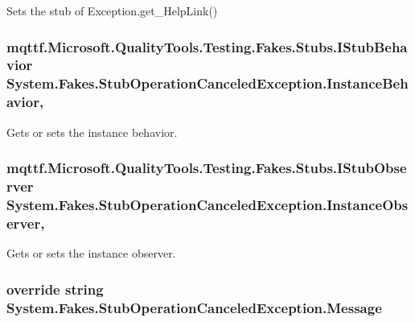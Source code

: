 Sets the stub of Exception.\-get\-\_\-\-Help\-Link()

\hypertarget{class_system_1_1_fakes_1_1_stub_operation_canceled_exception_acfff1c582ce3010a413a1638003b8d2a}{
\subsubsection[{Instance\-Behavior}]{\setlength{\rightskip}{0pt plus 5cm}mqttf.\-Microsoft.\-Quality\-Tools.\-Testing.\-Fakes.\-Stubs.\-I\-Stub\-Behavior System.\-Fakes.\-Stub\-Operation\-Canceled\-Exception.\-Instance\-Behavior\hspace{0.3cm}{\ttfamily [get]}, {\ttfamily [set]}}}\label{class_system_1_1_fakes_1_1_stub_operation_canceled_exception_acfff1c582ce3010a413a1638003b8d2a}


Gets or sets the instance behavior.

\hypertarget{class_system_1_1_fakes_1_1_stub_operation_canceled_exception_a9f89a64215f82bc8d1fee17ce94c1b57}{
\subsubsection[{Instance\-Observer}]{\setlength{\rightskip}{0pt plus 5cm}mqttf.\-Microsoft.\-Quality\-Tools.\-Testing.\-Fakes.\-Stubs.\-I\-Stub\-Observer System.\-Fakes.\-Stub\-Operation\-Canceled\-Exception.\-Instance\-Observer\hspace{0.3cm}{\ttfamily [get]}, {\ttfamily [set]}}}\label{class_system_1_1_fakes_1_1_stub_operation_canceled_exception_a9f89a64215f82bc8d1fee17ce94c1b57}


Gets or sets the instance observer.

\hypertarget{class_system_1_1_fakes_1_1_stub_operation_canceled_exception_a468382393c3d9dd8029035d81ac17f27}{
\subsubsection[{Message}]{\setlength{\rightskip}{0pt plus 5cm}override string System.\-Fakes.\-Stub\-Operation\-Canceled\-Exception.\-Message\hspace{0.3cm}{\ttfamily [get]}}}\label{class_system_1_1_fakes_1_1_stub_operation_canceled_exception_a468382393c3d9dd8029035d81ac17f27}


